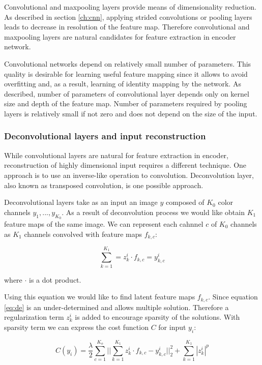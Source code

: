 Convolutional and maxpooling layers provide means of dimensionality reduction.
As described in section \ref{ch:cnn}, applying strided convolutions or pooling layers leads to decrease in resolution of the feature map.
Therefore convolutional and maxpooling layers are natural candidates for feature extraction in encoder network.

Convolutional networks depend on relatively small number of parameters.
This quality is desirable for learning useful feature mapping since it allows to avoid overfitting and, as a result, learning of identity mapping by the network.
As described, number of parameters of convolutional layer depends only on kernel size and depth of the feature map.
Number of parameters required by pooling layers is relatively small if not zero and does not depend on the size of the input.

\subsubsection{Deconvolutional layers and input reconstruction}

While convolutional layers are natural for feature extraction in encoder, reconstruction of highly dimensional input requires a different technique.
One approach is to use an inverse-like operation to convolution.
Deconvolution layer, also known as transposed convolution, is one possible approach.

Deconvolutional layers \cite{Zeiler2010} take as an input an image $y$ composed of $K_0$ color channels $y_1, ... , y_{K_0}$.
As a result of deconvolution process we would like obtain $K_1$ feature maps of the same image.
We can represent each cahnnel $c$ of $K_0$ channels as $K_1$ channels convolved with feature maps $f_{k,c}$:

\begin{equation}\label{eq:de}
  \sum^{K_1}_{k=1}=z^i_k \cdot f_{k,c} = y^i_{k,c}
\end{equation}

where $\cdot$ is a dot product.

Using this equation we would like to find latent feature maps $f_{k,c}$.
Since equation \ref{eq:de} is an under-determined and allows multiple solution.
Therefore a regularization term $z^i_k$ is added to encourage sparsity of the solutions.
With sparsity term we can express the cost function $C$ for input $y_i$:

\begin{equation}\label{eq:dec}
    C(y_i) = \frac{\lambda}{2} \sum^{K_o}_{c=1} ||\sum^{K_1}_{k=1}{z^i_k \cdot f_{k,c} - y^i_{k,c}}||^2_2 + \sum^{K_1}_{k=1}{|z^i_k|^p}
\end{equation}

